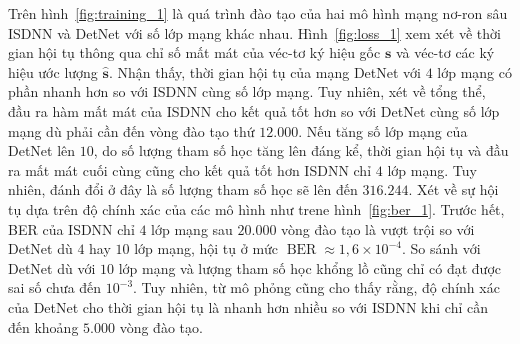 Trên hình~\ref{fig:training_1} là quá trình đào tạo của hai mô hình mạng nơ-ron sâu ISDNN và DetNet với số lớp mạng khác nhau. Hình~\ref{fig:loss_1} xem xét về thời gian hội tụ thông qua chỉ số mất mát của véc-tơ ký hiệu gốc $\mathbf{s}$ và véc-tơ các ký hiệu ước lượng $\mathbf{\hat{s}}$. Nhận thấy, thời gian hội tụ của mạng DetNet với $4$ lớp mạng có phần nhanh hơn so với ISDNN cùng số lớp mạng. Tuy nhiên, xét về tổng thể, đầu ra hàm mất mát của ISDNN cho kết quả tốt hơn so với DetNet cùng số lớp mạng dù phải cần đến vòng đào tạo thứ $12.000$. Nếu tăng số lớp mạng của DetNet lên $10$, do số lượng tham số học tăng lên đáng kể, thời gian hội tụ và đầu ra mất mát cuối cùng cũng cho kết quả tốt hơn ISDNN chỉ $4$ lớp mạng. Tuy nhiên, đánh đổi ở đây là số lượng tham số học sẽ lên đến $316.244$. Xét về sự hội tụ dựa trên độ chính xác của các mô hình như trene hình~\ref{fig:ber_1}. Trước hết, BER của ISDNN chỉ $4$ lớp mạng sau $20.000$ vòng đào tạo là vượt trội so với DetNet dù $4$ hay $10$ lớp mạng, hội tụ ở mức $\operatorname{BER}\approx 1,6 \times 10^{-4}$. So sánh với DetNet dù với $10$ lớp mạng và lượng tham số học khổng lồ cũng chỉ có đạt được sai số chưa đến $10^{-3}$. Tuy nhiên, từ mô phỏng cũng cho thấy rằng, độ chính xác của DetNet cho thời gian hội tụ là nhanh hơn nhiều so với ISDNN khi chỉ cần đến khoảng $5.000$ vòng đào tạo.

